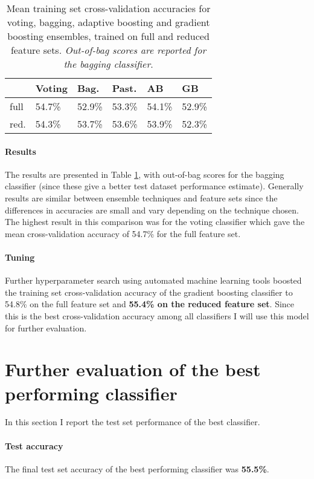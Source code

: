 \documentclass[10pt, twocolumn]{article}
\begin{document}
\begin{table}[]
	\begin{tabularx}{\linewidth}{XXXXXX}
		\hline
			& \textbf{Voting} & \textbf{Bag.} &\textbf{Past.} & \textbf{AB} & \textbf{GB} \\ \hline
	full   & 54.7\%  & 52.9\% & 53.3\% & 54.1\% & 52.9\% \\
	red. & 54.3\% & 53.7\% & 53.6\% & 53.9\% & 52.3\% \\ 
	\hline
	\end{tabularx}
	\caption{Mean training set cross-validation accuracies for voting, bagging, adaptive boosting and gradient boosting ensembles, trained on full and reduced feature sets. \textit{Out-of-bag scores are reported for the bagging classifier}.}\label{ensemble}
\end{table}

\paragraph{Results} The results are presented in Table \ref{ensemble}, with out-of-bag scores for the bagging classifier (since these give a better test dataset performance estimate). Generally results are similar between ensemble techniques and feature sets since the differences in accuracies are small and vary depending on the technique chosen. The highest result in this comparison was for the voting classifier which gave the mean cross-validation accuracy of 54.7\% for the full feature set.


\paragraph{Tuning}
Further hyperparameter search using automated machine learning tools \cite{OlsonGECCO2016} boosted the training set cross-validation accuracy of the gradient boosting classifier to 54.8\% on the full feature set and \textbf{55.4\% on the reduced feature set}. Since this is the best cross-validation accuracy among all classifiers I will use this model for further evaluation.

\section{Further evaluation of the best performing classifier}
In this section I report the test set performance of the best classifier.

\paragraph{Test accuracy} The final test set accuracy of the best performing classifier was \textbf{55.5\%}. 
\end{document}

